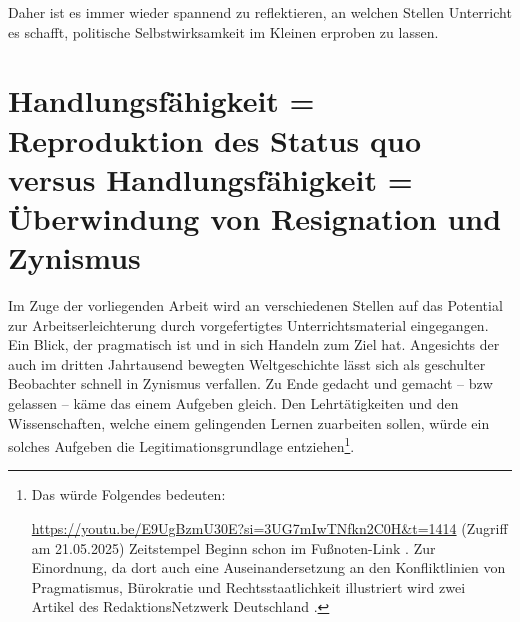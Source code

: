 Daher ist es immer wieder spannend zu reflektieren, an welchen Stellen Unterricht es schafft, politische Selbstwirksamkeit im Kleinen erproben zu lassen.  






\section{Handlungsfähigkeit = Reproduktion des Status quo versus Handlungsfähigkeit = Überwindung von Resignation und Zynismus}
Im Zuge der vorliegenden Arbeit wird an verschiedenen Stellen auf das Potential zur Arbeitserleichterung durch vorgefertigtes Unterrichtsmaterial eingegangen. Ein Blick, der pragmatisch ist und in sich Handeln zum Ziel hat. Angesichts der auch im dritten Jahrtausend bewegten Weltgeschichte lässt sich als geschulter Beobachter schnell in Zynismus verfallen. Zu Ende gedacht und gemacht -- \gls{bzw} gelassen -- käme das einem Aufgeben gleich. Den Lehrtätigkeiten und den Wissenschaften, welche einem gelingenden Lernen zuarbeiten sollen, würde ein solches Aufgeben die Legitimationsgrundlage entziehen\footnote{
    Das würde Folgendes bedeuten: 

    \url{https://youtu.be/E9UgBzmU30E?si=3UG7mIwTNfkn2C0H&t=1414} (Zugriff am 21.05.2025) Zeitstempel Beginn schon im Fußnoten-Link \autocite[][Als Meme von $23^{\prime}34^{\prime\prime}$ bis $23^{\prime}50^{\prime\prime}$ schauen]{Wolle}. Zur Einordnung, da dort auch %
    eine Auseinandersetzung an den Konfliktlinien von Pragmatismus, Bürokratie und Rechtsstaatlichkeit illustriert wird zwei Artikel des RedaktionsNetzwerk Deutschland \autocites{Schwarzer.05.02.2021}{Schwarzer.08.02.2021}.
    }. 


